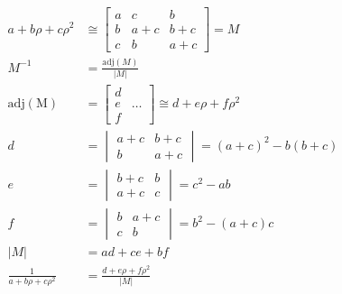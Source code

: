 \documentclass{article}
\begin{document}
\begin{align*}
  a+b\rho+c\rho^2 &\cong
  \begin{bmatrix}
    a & c & b \\
    b & a+c & b+c \\
    c & b & a+c
  \end{bmatrix} = M \\
  M^{-1} &= \frac{\mathrm{adj}(M)}{\lvert M \rvert} \\
  \mathrm{adj(M)} &=
  \begin{bmatrix}
    d & \\
    e & \hdots \\
    f &
  \end{bmatrix}
  \cong d+e\rho+f\rho^2 \\
  d &=
  \begin{vmatrix}
    a+c & b+c \\
    b & a+c
  \end{vmatrix}
  = (a+c)^2-b(b+c) \\
  e &=
  \begin{vmatrix}
    b+c & b \\
    a+c & c
  \end{vmatrix}
  = c^2-ab \\
  f &=
  \begin{vmatrix}
    b & a+c \\
    c & b
  \end{vmatrix}
  = b^2-(a+c)c \\
  \lvert M \rvert &= ad+ce+bf \\
  \frac{1}{a+b\rho+c\rho^2} &=
  \frac{d+e\rho+f\rho^2}{\lvert M \rvert} \\
\end{align*}
\end{document}
